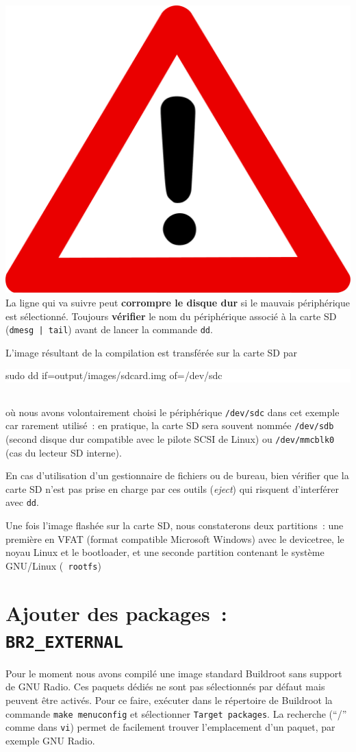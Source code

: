 \documentclass[a4paper]{article}
\begin{document}
\includegraphics[width=.7cm]{danger} 
La ligne qui va suivre peut {\bf corrompre le disque dur} si le
mauvais p\'eriph\'erique est s\'electionn\'e. Toujours {\bf v\'erifier} le
nom du p\'eriph\'erique associ\'e \`a la carte SD (\verb~dmesg | tail~) avant
de lancer la commande {\tt dd}.

L'image r\'esultant de la compilation est transf\'er\'ee sur la carte SD par\\
\colorbox{white}{\begin{minipage}{0.9\textwidth}
sudo dd if=output/images/sdcard.img of=/dev/sdc
\end{minipage}} \\
o\`u nous avons volontairement choisi le p\'eriph\'erique {\tt /dev/sdc} dans cet
exemple car rarement utilis\'e~: en pratique, la carte SD sera souvent
nomm\'ee {\tt /dev/sdb} (second disque dur compatible avec le pilote SCSI de
Linux) ou {\tt /dev/mmcblk0} (cas du lecteur SD interne).

En cas d'utilisation d'un gestionnaire de fichiers ou de bureau, bien v\'erifier
que la carte SD n'est pas prise en charge par ces outils ({\em eject}) qui risquent
d'interf\'erer avec {\tt dd}.

\noindent{}

Une fois l'image flash\'ee sur la carte SD, nous constaterons deux partitions~: une
premi\`ere en VFAT (format compatible Microsoft Windows) avec le devicetree, le noyau
Linux et le bootloader, et une seconde partition contenant le syst\`eme GNU/Linux ({\tt 
rootfs}) 

\section{Ajouter des packages~: {\tt BR2\_EXTERNAL}}

Pour le moment nous avons compil\'e une image standard Buildroot sans support de
GNU Radio. Ces paquets d\'edi\'es ne sont pas s\'electionn\'es par d\'efaut mais
peuvent \^etre activ\'es. Pour ce faire, ex\'ecuter dans le r\'epertoire de Buildroot
la commande {\tt make menuconfig} et s\'electionner {\tt Target 
packages}. La recherche (``/'' comme dans {\tt vi}) permet de facilement trouver l'emplacement
d'un paquet, par exemple GNU Radio. 
\end{document}

